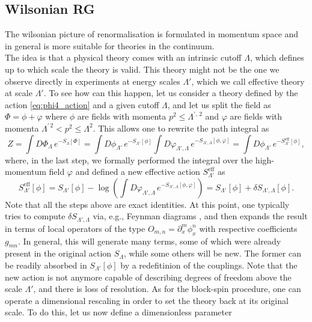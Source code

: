 \subsection*{Wilsonian RG}
\label{sec:wilson_rg}
The wilsonian picture of renormalisation \cite{WilsonRG1,WilsonRG2} is formulated in momentum space and in general is more suitable for theories in the continuum.\\
The idea is that a physical theory comes with an intrinsic cutoff $\Lambda$, which defines up to which scale the theory is valid. This theory might not be the one
we observe directly in experiments at energy scales $\Lambda'$, which we call effective theory at scale $\Lambda'$. To see how can this happen, let us consider a theory defined by the action \eqref{eq:phi4_action} and a given cutoff $\Lambda$, and let us split the field as $\Phi = \phi + \varphi$ where $\phi$ are fields with momenta $p^2 \leq \Lambda^{\prime, \, 2}$ and $\varphi$ are fields with momenta $\Lambda^{\prime \, 2} < p^2 \leq \Lambda^2$. This allows one to rewrite the path integral as
\begin{equation*}
    Z = \int D\Phi_\Lambda \, e^{-S_\Lambda[\Phi]} = \int D\phi_{\Lambda'} \, e^{-S_{\Lambda'}[\phi]} \int D\varphi_{\Lambda', \Lambda}  \, e^{-S_{\Lambda', \Lambda}[\phi, \varphi]} = \int D\phi_{\Lambda'} \, e^{-S_{\Lambda'}^\text{eff}[\phi]},
\end{equation*}
where, in the last step, we formally performed the integral over the high-momentum field $\varphi$ and defined a new effective action $S^\text{eff}_{\Lambda'}$ as
\begin{equation*}
    S_{\Lambda'}^\text{eff}[\phi] = S_{\Lambda'}[\phi] - \log\left( \int D\varphi_{\Lambda', \Lambda}  \, e^{-S_{\Lambda', \Lambda}[\phi, \varphi]}\right) =  S_{\Lambda'}[\phi] + \delta S_{\Lambda', \Lambda}[\phi].
\end{equation*}
Note that all the steps above are exact identities. At this point, one typically tries to compute $\delta S_{\Lambda', \Lambda}$ via, e.g., Feynman diagrams \cite{Peskin:1995ev}, and then expands the result in terms of local operators of the type $O_{m,n} = \partial^m_x\phi^n_x$ with respective coefficients $g_{mn}$. In general, this will generate many terms, some of which were already present in the original action $S_\Lambda$, while some others will be new. The former can be readily absorbed in $S_{\Lambda'}[\phi]$ by a redefitinion of the couplings. 
Note that the new action is not anymore capable of describing degrees of freedom above the scale $\Lambda'$, and there is loss of resolution. As for the block-spin procedure, one can operate a dimensional rescaling in order to set the theory back at its original scale. To do this, let us now define a dimensionless parameter 
